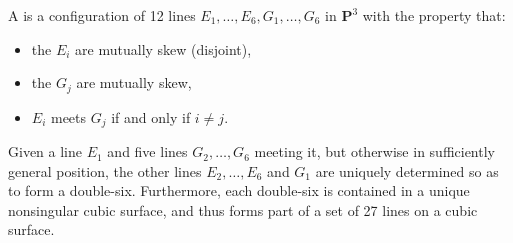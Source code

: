 A  is a configuration of 12 lines $E_1, \ldots, E_6, G_1, \ldots, G_6$ in $\mathbf{P}^3$ with the property that:
\begin{itemize}
\item the $E_i$ are mutually skew (disjoint),
\item the $G_j$ are mutually skew,
\item $E_i$ meets $G_j$ if and only if $i \neq j$.
\end{itemize}

Given a line $E_1$ and five lines $G_2, \ldots, G_6$ meeting it, but otherwise in sufficiently general position, the other lines $E_2, \ldots, E_6$ and $G_1$ are uniquely determined so as to form a double-six. Furthermore, each double-six is contained in a unique nonsingular cubic surface, and thus forms part of a set of 27 lines on a cubic surface.
